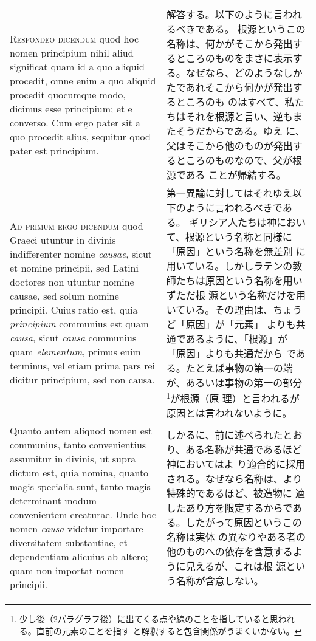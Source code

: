 \documentclass[10pt]{jsarticle} %
\begin{document}
\begin{longtable}{p{21em}p{21em}}
{\scshape Respondeo dicendum} quod hoc nomen principium nihil aliud significat
quam id a quo aliquid procedit, omne enim a quo aliquid procedit
quocumque modo, dicimus esse principium; et e converso. Cum ergo pater
sit a quo procedit alius, sequitur quod pater est principium.


&

解答する。以下のように言われるべきである。
根源というこの名称は、何かがそこから発出するところのものをまさに表示す
 る。なぜなら、どのようなしかたであれそこから何かが発出するところのも
 のはすべて、私たちはそれを根源と言い、逆もまたそうだからである。ゆえ
 に、父はそこから他のものが発出するところのものなので、父が根源である
 ことが帰結する。

\\



{\scshape Ad primum ergo dicendum} quod Graeci utuntur in divinis indifferenter
nomine {\itshape causae}, sicut et nomine principii, sed Latini doctores non
utuntur nomine causae, sed solum nomine principii. Cuius ratio est,
quia {\itshape principium} communius est quam {\itshape causa}, sicut {\itshape causa} communius quam
{\itshape elementum}, primus enim terminus, vel etiam prima pars rei dicitur
principium, sed non causa. 

&

第一異論に対してはそれゆえ以下のように言われるべきである。
ギリシア人たちは神において、根源という名称と同様に「原因」という名称を無差別
 に用いている。しかしラテンの教師たちは原因という名称を用いずただ根
 源という名称だけを用いている。その理由は、ちょうど「原因」が「元素」
 よりも共通であるように、「根源」が「原因」よりも共通だから
 である。たとえば事物の第一の端が、あるいは事物の第一の部分
 \footnote{少し後（2パラグラフ後）に出てくる点や線のことを指していると思われる。直前の元素のことを指す
 と解釈すると包含関係がうまくいかない。}が根源（原
 理）と言われるが原因とは言われないように。

\\


Quanto autem aliquod nomen est communius,
tanto convenientius assumitur in divinis, ut supra dictum est, quia
nomina, quanto magis specialia sunt, tanto magis determinant modum
convenientem creaturae. Unde hoc nomen {\itshape causa} videtur importare
diversitatem substantiae, et dependentiam alicuius ab altero; quam non
importat nomen principii. 



&

しかるに、前に述べられたとおり、ある名称が共通であるほど神においてはよ
 り適合的に採用される。なぜなら名称は、より特殊的であるほど、被造物に
 適したあり方を限定するからである。したがって原因というこの名称は実体
 の異なりやある者の他のものへの依存を含意するように見えるが、これは根
 源という名称が含意しない。




\end{longtable}
\end{document}
